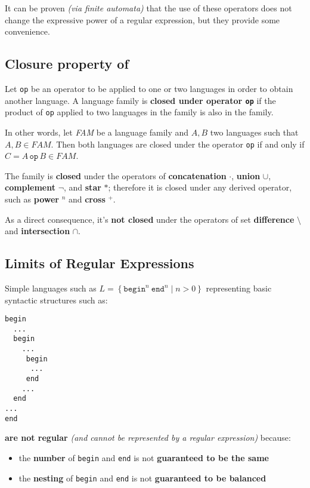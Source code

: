 \documentclass[english]{article}
\begin{document}
\bigskip
It can be proven \textit{(via finite automata)} that the use of these operators does not change the expressive power of a regular expression, but they provide some convenience.

\subsection{Closure property of \REG}
\label{sec:closure-of-regular-expressions}

Let \texttt{op} be an operator to be applied to one or two languages in order to obtain another language.
A language family is \textbf{closed under operator \texttt{op}} if the product of \texttt{op} applied to two languages in the family is also in the family.

In other words, let \textit{FAM} be a language family and \(A, B\) two languages such that \(A, B \in FAM\).
Then both languages are closed under the operator \texttt{op} if and only if \(C = A \, \texttt{op} \, B \in FAM\).

\begin{definition}
  The family \REG is \textbf{closed} under the operators of \textbf{concatenation} \(\cdot\), \textbf{union} \(\cup\), \textbf{complement} \(\lnot\), and \textbf{star} \(\ast\);
  therefore it is closed under any derived operator, such as \textbf{power} \(^n\) and \textbf{cross} \(^+\).

  As a direct consequence, it's \textbf{not closed} under the operators of set \textbf{difference} \(\setminus\) and \textbf{intersection} \(\cap\).
\end{definition}

\subsection{Limits of Regular Expressions}

Simple languages such as \(L = \left\{ \texttt{begin}^n \ \texttt{end}^n \mid n > 0 \right\}\) representing basic syntactic structures such as:

\begin{verbatim}
begin
  ...
  begin
    ...
     begin
      ...
     end
    ...
  end
...
end
\end{verbatim}

\textbf{are not regular} \textit{(and cannot be represented by a regular expression)} because:

\begin{itemize}
  \item the \textbf{number} of \texttt{begin} and \texttt{end} is not \textbf{guaranteed to be the same}
  \item the \textbf{nesting} of \texttt{begin} and \texttt{end} is not \textbf{guaranteed to be balanced}
\end{itemize}
\end{document}
